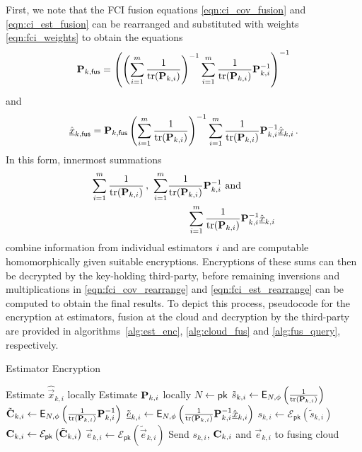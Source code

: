 \documentclass[letterpaper, 10 pt, conference]{ieeeconf}
\begin{document}
First, we note that the FCI fusion equations \eqref{eqn:ci_cov_fusion} and \eqref{eqn:ci_est_fusion} can be rearranged and substituted with weights \eqref{eqn:fci_weights} to obtain the equations
\begin{equation}\label{eqn:fci_cov_rearrange}
    {\ensuremath{{\mathbf{P}}}}_{k,\mathsf{fus}} = \left(\left(\sum_{i=1}^m \frac{1}{\operatorname{tr}({{\mathbf{P}}}_{k,i})}\right)^{-1}\sum_{i=1}^m \frac{1}{\operatorname{tr}({{\mathbf{P}}}_{k,i})}{{\mathbf{P}}}_{k,i}^{-1}\right)^{-1}
\end{equation}
and
\begin{equation}\label{eqn:fci_est_rearrange}
    \hat{{\underline{x}}}_{k,\mathsf{fus}} = {{\mathbf{P}}}_{k,\mathsf{fus}}\left(\sum_{i=1}^m \frac{1}{\operatorname{tr}({{\mathbf{P}}}_{k,i})}\right)^{-1}\sum_{i=1}^m\frac{1}{\operatorname{tr}({{\mathbf{P}}}_{k,i})}{{\mathbf{P}}}_{k,i}^{-1}\hat{{\underline{x}}}_{k,i}\,.
\end{equation}
In this form, innermost summations  
\begin{equation}
    \begin{split}
        \sum_{i=1}^m \frac{1}{\operatorname{tr}({{\mathbf{P}}}_{k,i})}\,,\ \sum_{i=1}^m &\frac{1}{\operatorname{tr}({{\mathbf{P}}}_{k,i})}{{\mathbf{P}}}_{k,i}^{-1}\text{ and }\\ 
        &\qquad\sum_{i=1}^m\frac{1}{\operatorname{tr}({{\mathbf{P}}}_{k,i})}{{\mathbf{P}}}_{k,i}^{-1}\hat{{\underline{x}}}_{k,i}
    \end{split}
\end{equation}
combine information from individual estimators $i$ and are computable homomorphically given suitable encryptions. Encryptions of these sums can then be decrypted by the key-holding third-party, before remaining inversions and multiplications in \eqref{eqn:fci_cov_rearrange} and \eqref{eqn:fci_est_rearrange} can be computed to obtain the final results. To depict this process, pseudocode for the encryption at estimators, fusion at the cloud and decryption by the third-party are provided in algorithms~\ref{alg:est_enc}, \ref{alg:cloud_fus} and \ref{alg:fus_query}, respectively.
\begin{algorithm}[htbp]
\caption{Estimator Encryption}\label{alg:est_enc}
\begin{algorithmic}[1]
    \State Estimate $\hat{\vec{x}}_{k,i}$ locally
    \State Estimate ${{\mathbf{P}}}_{k,i}$ locally
    \State $N \gets \mathsf{pk}$
    \State $\tilde{s}_{k,i} \gets \mathsf{E}_{N,\phi}\left(\frac{1}{\operatorname{tr}({{\mathbf{P}}}_{k,i})}\right)$
    \State $\tilde{{{\mathbf{C}}}}_{k,i} \gets \mathsf{E}_{N,\phi}\left(\frac{1}{\operatorname{tr}({{\mathbf{P}}}_{k,i})}{{\mathbf{P}}}_{k,i}^{-1}\right)$
    \State $\tilde{{\underline{e}}}_{k,i} \gets \mathsf{E}_{N,\phi}\left(\frac{1}{\operatorname{tr}({{\mathbf{P}}}_{k,i})}{{\mathbf{P}}}_{k,i}^{-1}\hat{{\underline{x}}}_{k,i}\right)$
    \State $s_{k,i} \gets \mathcal{E}_{\mathsf{pk}}\left(\tilde{s}_{k,i}\right)$
    \State ${{\mathbf{C}}}_{k,i} \gets \mathcal{E}_{\mathsf{pk}}\left(\tilde{{{\mathbf{C}}}}_{k,i}\right)$
    \State $\vec{e}_{k,i} \gets \mathcal{E}_{\mathsf{pk}}\left(\tilde{\vec{e}}_{k,i}\right)$
    \State Send $s_{k,i}$, ${{\mathbf{C}}}_{k,i}$ and $\vec{e}_{k,i}$ to fusing cloud
    \EndProcedure
\end{algorithmic}
\end{algorithm}
\end{document}
